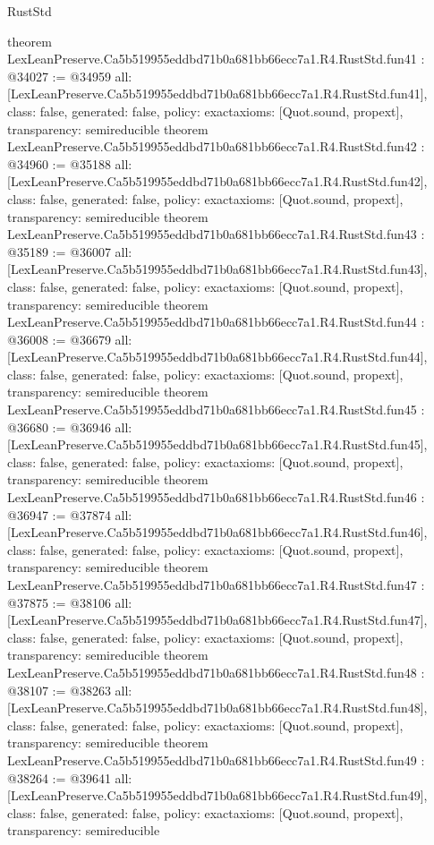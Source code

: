 \begin{lexlean}{RustStd}
\begin{coremodule}
{}
theorem LexLeanPreserve.Ca5b519955eddbd71b0a681bb66ecc7a1.R4.RustStd.fun41 : @34027 := @34959 {
  all: [LexLeanPreserve.Ca5b519955eddbd71b0a681bb66ecc7a1.R4.RustStd.fun41],
  class: false,
  generated: false,
  policy: exact{axioms: [Quot.sound, propext]},
  transparency: semireducible
}
theorem LexLeanPreserve.Ca5b519955eddbd71b0a681bb66ecc7a1.R4.RustStd.fun42 : @34960 := @35188 {
  all: [LexLeanPreserve.Ca5b519955eddbd71b0a681bb66ecc7a1.R4.RustStd.fun42],
  class: false,
  generated: false,
  policy: exact{axioms: [Quot.sound, propext]},
  transparency: semireducible
}
theorem LexLeanPreserve.Ca5b519955eddbd71b0a681bb66ecc7a1.R4.RustStd.fun43 : @35189 := @36007 {
  all: [LexLeanPreserve.Ca5b519955eddbd71b0a681bb66ecc7a1.R4.RustStd.fun43],
  class: false,
  generated: false,
  policy: exact{axioms: [Quot.sound, propext]},
  transparency: semireducible
}
theorem LexLeanPreserve.Ca5b519955eddbd71b0a681bb66ecc7a1.R4.RustStd.fun44 : @36008 := @36679 {
  all: [LexLeanPreserve.Ca5b519955eddbd71b0a681bb66ecc7a1.R4.RustStd.fun44],
  class: false,
  generated: false,
  policy: exact{axioms: [Quot.sound, propext]},
  transparency: semireducible
}
theorem LexLeanPreserve.Ca5b519955eddbd71b0a681bb66ecc7a1.R4.RustStd.fun45 : @36680 := @36946 {
  all: [LexLeanPreserve.Ca5b519955eddbd71b0a681bb66ecc7a1.R4.RustStd.fun45],
  class: false,
  generated: false,
  policy: exact{axioms: [Quot.sound, propext]},
  transparency: semireducible
}
theorem LexLeanPreserve.Ca5b519955eddbd71b0a681bb66ecc7a1.R4.RustStd.fun46 : @36947 := @37874 {
  all: [LexLeanPreserve.Ca5b519955eddbd71b0a681bb66ecc7a1.R4.RustStd.fun46],
  class: false,
  generated: false,
  policy: exact{axioms: [Quot.sound, propext]},
  transparency: semireducible
}
theorem LexLeanPreserve.Ca5b519955eddbd71b0a681bb66ecc7a1.R4.RustStd.fun47 : @37875 := @38106 {
  all: [LexLeanPreserve.Ca5b519955eddbd71b0a681bb66ecc7a1.R4.RustStd.fun47],
  class: false,
  generated: false,
  policy: exact{axioms: [Quot.sound, propext]},
  transparency: semireducible
}
theorem LexLeanPreserve.Ca5b519955eddbd71b0a681bb66ecc7a1.R4.RustStd.fun48 : @38107 := @38263 {
  all: [LexLeanPreserve.Ca5b519955eddbd71b0a681bb66ecc7a1.R4.RustStd.fun48],
  class: false,
  generated: false,
  policy: exact{axioms: [Quot.sound, propext]},
  transparency: semireducible
}
theorem LexLeanPreserve.Ca5b519955eddbd71b0a681bb66ecc7a1.R4.RustStd.fun49 : @38264 := @39641 {
  all: [LexLeanPreserve.Ca5b519955eddbd71b0a681bb66ecc7a1.R4.RustStd.fun49],
  class: false,
  generated: false,
  policy: exact{axioms: [Quot.sound, propext]},
  transparency: semireducible
}
\end{coremodule}
\end{lexlean}
